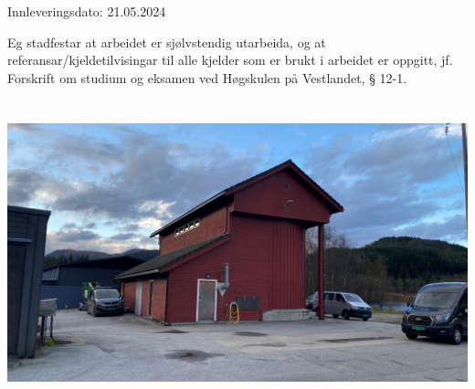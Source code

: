\vspace{-0.4cm}
{\fontsize{20}{20}\selectfont\textcolor{mylysbla}{Innleveringsdato: 21.05.2024}} 



{\selectfont}


\vspace{1cm}

{\fontsize{9.5}{20}\selectfont
Eg stadfestar at arbeidet er sjølvstendig utarbeida, og at referansar/kjeldetilvisingar til alle
kjelder som er brukt i arbeidet er oppgitt, jf. Forskrift om studium og eksamen ved Høgskulen på Vestlandet, § 12-1.
}

\newpage




\chapter*{}
\thispagestyle{fancy}

\noindent\begin{adjustbox}{center=\paperwidth}
	\hspace*{-0.75\textwidth} %
    \includegraphics[width=1.3\textwidth]{Bilder/Framside RA200.jpg}
\end{adjustbox}

\thispagestyle{empty}